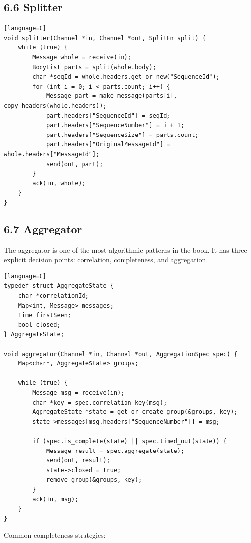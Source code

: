 \documentclass[11pt]{article}
\begin{document}
\subsection{6.6 Splitter}\label{splitter}

\begin{verbatim}[language=C]
void splitter(Channel *in, Channel *out, SplitFn split) {
    while (true) {
        Message whole = receive(in);
        BodyList parts = split(whole.body);
        char *seqId = whole.headers.get_or_new("SequenceId");
        for (int i = 0; i < parts.count; i++) {
            Message part = make_message(parts[i], copy_headers(whole.headers));
            part.headers["SequenceId"] = seqId;
            part.headers["SequenceNumber"] = i + 1;
            part.headers["SequenceSize"] = parts.count;
            part.headers["OriginalMessageId"] = whole.headers["MessageId"];
            send(out, part);
        }
        ack(in, whole);
    }
}
\end{verbatim}

\subsection{6.7 Aggregator}\label{aggregator}

The aggregator is one of the most algorithmic patterns in the book. It
has three explicit decision points: correlation, completeness, and
aggregation.

\begin{verbatim}[language=C]
typedef struct AggregateState {
    char *correlationId;
    Map<int, Message> messages;
    Time firstSeen;
    bool closed;
} AggregateState;

void aggregator(Channel *in, Channel *out, AggregationSpec spec) {
    Map<char*, AggregateState> groups;

    while (true) {
        Message msg = receive(in);
        char *key = spec.correlation_key(msg);
        AggregateState *state = get_or_create_group(&groups, key);
        state->messages[msg.headers["SequenceNumber"]] = msg;

        if (spec.is_complete(state) || spec.timed_out(state)) {
            Message result = spec.aggregate(state);
            send(out, result);
            state->closed = true;
            remove_group(&groups, key);
        }
        ack(in, msg);
    }
}
\end{verbatim}

Common completeness strategies:
\end{document}
